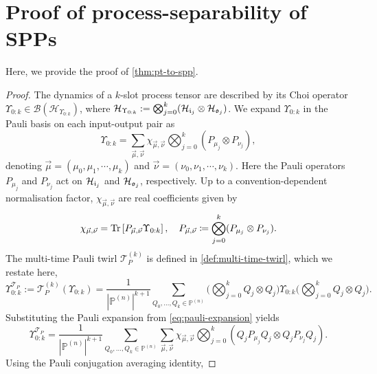 \section{Proof of process-separability of SPPs}\label{app:proof-pt-to-spp}
Here, we provide the proof of \cref{thm:pt-to-spp}.
\begin{proof}
    The dynamics of a \(k\)-slot process tensor are described by its Choi operator \(\Upsilon_{0:k}\in\mathcal{B}(\mathcal{H}_{\Upsilon_{0:k}})\), where \(\mathcal{H}_{\Upsilon_{0:k}}:=\bigotimes_{j=0}^k(\mathcal{H}_{\mathfrak{i}_j}\otimes\mathcal{H}_{\mathfrak{o}_j})\). We expand \(\Upsilon_{0:k}\) in the Pauli basis on each input-output pair as
    \begin{equation}\label{eq:pauli-expansion}
        \Upsilon_{0:k} = \sum_{\vec{\mu},\vec{\nu}} \chi_{\vec{\mu},\vec{\nu}} \bigotimes_{j=0}^k (P_{\mu_j}\otimes P_{\nu_j}),
    \end{equation}
    denoting \(\vec{\mu} = (\mu_0,\mu_1,\cdots,\mu_k)\) and \(\vec{\nu} = (\nu_0,\nu_1,\cdots,\nu_k)\). Here the Pauli operators \(P_{\mu_j}\) and \(P_{\nu_j}\) act on \(\mathcal{H}_{\mathfrak{i}_j}\) and \(\mathcal{H}_{\mathfrak{o}_j}\), respectively. Up to a convention-dependent normalisation factor, \(\chi_{\vec{\mu},\vec{\nu}}\) are real coefficients given by
    \begin{equation}
        \chi_{\vec{\mu},\vec{\nu}} = \mathrm{Tr}\left[P_{\vec{\mu},\vec{\nu}}\Upsilon_{0:k}\right], \quad
        P_{\vec{\mu},\vec{\nu}} \coloneq \bigotimes_{j=0}^k (P_{\mu_j}\otimes P_{\nu_j}).
    \end{equation}
    The multi-time Pauli twirl \(\mathcal{T}_P^{(k)}\) is defined in \cref{def:multi-time-twirl}, which we restate here,
    \begin{equation}
        \Upsilon_{0:k}^{\mathcal{T}_P} := \mathcal{T}_P^{(k)}(\Upsilon_{0:k}) = \frac{1}{|\mathbb{P}^{(n)}|^{k+1}} \sum_{Q_0,\dots,Q_k\in\mathbb{P}^{(n)}} \bigg(\bigotimes_{j=0}^k Q_j\otimes Q_j\bigg) \Upsilon_{0:k} \bigg(\bigotimes_{j=0}^k Q_j\otimes Q_j\bigg).
    \end{equation}
    Substituting the Pauli expansion from \cref{eq:pauli-expansion} yields
    \begin{equation}\label{eq:pauli-sub}
        \Upsilon_{0:k}^{\mathcal{T}_P} = \frac{1}{|\mathbb{P}^{(n)}|^{k+1}} \sum_{Q_0,\dots,Q_k\in\mathbb{P}^{(n)}} \sum_{\vec{\mu},\vec{\nu}} \chi_{\vec{\mu},\vec{\nu}} \bigotimes_{j=0}^k (Q_j P_{\mu_j} Q_j \otimes Q_j P_{\nu_j} Q_j).
    \end{equation}
    Using the Pauli conjugation averaging identity,

\end{proof}
